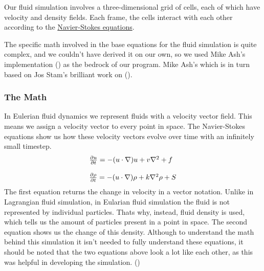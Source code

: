 \documentclass[a4paper,12pt]{article}
\begin{document}
Our fluid simulation involves a three-dimensional grid of cells, each of which
have velocity and density fields. Each frame, the cells interact with each
other according to the \href{https://en.wikipedia.org/wiki/Navier%E2%80%93Stokes_equations}{Navier-Stokes equations}.

The specific math involved in the base equations for the fluid simulation is
quite complex, and we couldn't have derived it on our own, so we used
Mike Ash's implementation \href{www.mikeash.com/pyblog/fluid-simulation-for-dummies.html}{} (\cite{mikeash})
as the bedrock of our program. Mike Ash's  which is in turn based on Jos Stam's
brilliant work on \href{www.dgp.toronto.edu/public_user/stam/reality/Research/pdf/GDC03.pdf}{} (\cite{josstam}).

\subsubsection{The Math}
In Eulerian fluid dynamics we represent fluids with a velocity vector field. This means we assign a velocity vector to every point in space.
The Navier-Stokes equations show us how these velocity vectors evolve over time with an infinitely small timestep.
\[
	\begin{array}{ll}
		\pdv{u}{t} = -(u \cdot \nabla)u + v\nabla^2 + f \\
		\\
		\pdv{\rho}{t} = -(u \cdot \nabla)\rho + k\nabla^2\rho + S
	\end{array}
\]
The first equation returns the change in velocity in a vector notation. 
Unlike in Lagrangian fluid simulation, in Eularian fluid simulation the fluid is not represented by individual particles. 
Thats why, instead, fluid density is used, which tells us the amount of particles present in a point in space. 
The second equation shows us the change of this density. 
Although to understand the math behind this simulation it isn't needed to fully understand these equations, it should be noted that the two equations above look a lot like each other,
as this was helpful in developing the simulation. (\cite{josstam})
\end{document}
